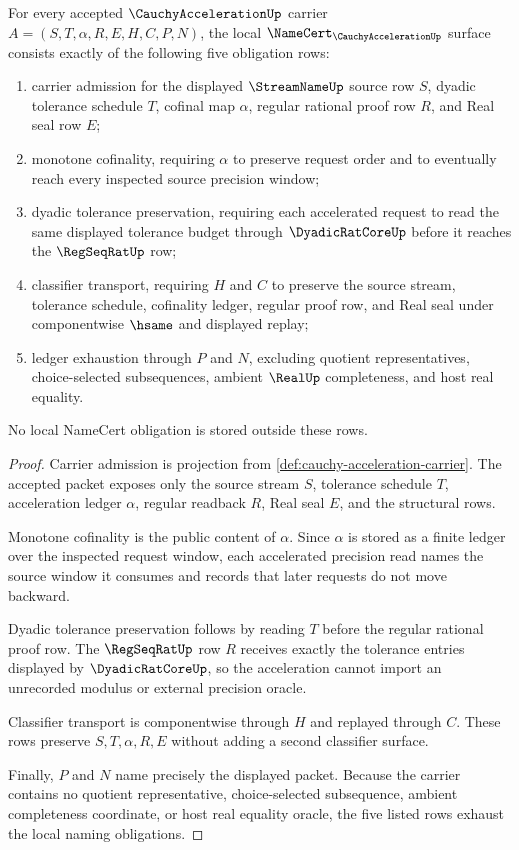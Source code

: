 \begin{theorem}
\label{thm:cauchy-acceleration-namecert-obligations}
For every accepted $\CauchyAccelerationUp$ carrier $A=(S,T,\alpha,R,E,H,C,P,N)$, the local $\NameCert_{\CauchyAccelerationUp}$ surface consists exactly of the following five obligation rows:
\begin{enumerate}
\item carrier admission for the displayed $\StreamNameUp$ source row $S$, dyadic tolerance schedule $T$, cofinal map $\alpha$, regular rational proof row $R$, and Real seal row $E$;
\item monotone cofinality, requiring $\alpha$ to preserve request order and to eventually reach every inspected source precision window;
\item dyadic tolerance preservation, requiring each accelerated request to read the same displayed tolerance budget through $\DyadicRatCoreUp$ before it reaches the $\RegSeqRatUp$ row;
\item classifier transport, requiring $H$ and $C$ to preserve the source stream, tolerance schedule, cofinality ledger, regular proof row, and Real seal under componentwise $\hsame$ and displayed replay;
\item ledger exhaustion through $P$ and $N$, excluding quotient representatives, choice-selected subsequences, ambient $\RealUp$ completeness, and host real equality.
\end{enumerate}
No local NameCert obligation is stored outside these rows.
\end{theorem}
\begin{proof}
Carrier admission is projection from \autoref{def:cauchy-acceleration-carrier}. The accepted packet exposes only the source stream $S$, tolerance schedule $T$, acceleration ledger $\alpha$, regular readback $R$, Real seal $E$, and the structural rows.

Monotone cofinality is the public content of $\alpha$. Since $\alpha$ is stored as a finite ledger over the inspected request window, each accelerated precision read names the source window it consumes and records that later requests do not move backward.

Dyadic tolerance preservation follows by reading $T$ before the regular rational proof row. The $\RegSeqRatUp$ row $R$ receives exactly the tolerance entries displayed by $\DyadicRatCoreUp$, so the acceleration cannot import an unrecorded modulus or external precision oracle.

Classifier transport is componentwise through $H$ and replayed through $C$. These rows preserve $S,T,\alpha,R,E$ without adding a second classifier surface.

Finally, $P$ and $N$ name precisely the displayed packet. Because the carrier contains no quotient representative, choice-selected subsequence, ambient completeness coordinate, or host real equality oracle, the five listed rows exhaust the local naming obligations.
\end{proof}

